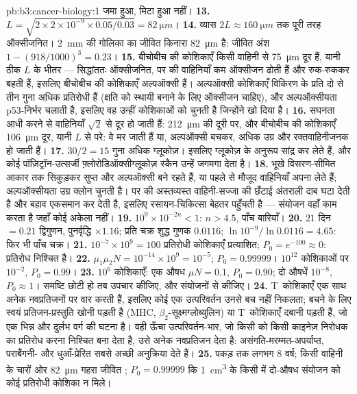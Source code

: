 \begin{solution}{pb:b3:cancer-biology:1}
जमा हुआ, मिटा हुआ नहीं।
\textbf{13.} $L = \sqrt{2\times 2\times 10^{-9}\times 0.05/0.03} =
\qty{82}{\micro m}$।
\textbf{14.} व्यास $2L \approx
\qty{160}{\micro m}$ तक पूरी तरह ऑक्सीजनित। \qty{2}{mm} की गोलिका का
जीवित किनारा \qty{82}{\micro m} है: जीवित अंश $1 - (918/1000)^{3} = 0.23$।
\textbf{15.} बीचोबीच की कोशिकाएँ किसी वाहिनी से \qty{75}{\micro m} दूर
हैं, यानी ठीक $L$ के भीतर --- सिद्धांततः ऑक्सीजनित, पर  की
वाहिनियाँ कम ऑक्सीजन ढोती हैं और रुक-रुककर बहती हैं, इसलिए बीचोबीच की
कोशिकाएँ अल्पऑक्सी हैं। अल्पऑक्सी कोशिकाएँ विकिरण के प्रति दो से तीन
गुना अधिक प्रतिरोधी हैं (क्षति को स्थायी बनाने के लिए ऑक्सीजन चाहिए),
और अल्पऑक्सीयता p53-निर्भर  चलाती है, इसलिए वह उन्हीं
कोशिकाओं को चुनती है जिन्होंने  खो दिया है।
\textbf{16.} सघनता आधी करने से वाहिनियाँ $\sqrt{2}$ से दूर हो जाती हैं:
\qty{212}{\micro m} की दूरी पर, और बीचोबीच की कोशिकाएँ
\qty{106}{\micro m} दूर, यानी $L$ से परे: वे मर जाती हैं या, अल्पऑक्सी
बचकर, अधिक उग्र और रक्तवाहिनीजनक हो जाती हैं।
\textbf{17.} $30/2 = 15$ गुना अधिक ग्लूकोज़। इसलिए  ग्लूकोज़ के
अनुरूप सांद्र कर लेते हैं, और कोई पॉज़िट्रॉन-उत्सर्जी
फ़्लोरोडिऑक्सीग्लूकोज़ स्कैन उन्हें जगमगा देता है।
\textbf{18.} भूखे  विसरण-सीमित आकार तक सिकुड़कर सुप्त और
अल्पऑक्सी बने रहते हैं, या पहले से मौजूद वाहिनियाँ अपना लेते हैं;
अल्पऑक्सीयता उग्र क्लोन चुनती है। पर  की अस्तव्यस्त
वाहिनी-सज्जा की छँटाई अंतराली दाब घटा देती है और बहाव एकसमान कर देती
है, इसलिए रसायन-चिकित्सा बेहतर पहुँचती है --- संयोजन वहाँ काम करता है
जहाँ कोई अकेला नहीं।
\textbf{19.} $10^{9}\times 10^{-2n} < 1$: $n > 4.5$, पाँच बारियाँ।
\textbf{20.} $21$ दिन $= 0.21$ द्विगुणन, पुनर्वृद्धि $\times 1.16$;
प्रति चक्र शुद्ध गुणक $0.0116$; $\ln 10^{-9}/\ln 0.0116 = 4.65$: फिर भी
पाँच चक्र।
\textbf{21.} $10^{-7}\times 10^{9} = 100$ प्रतिरोधी कोशिकाएँ
प्रत्याशित; $P_{0} = e^{-100} \approx 0$: प्रतिरोध निश्चित है।
\textbf{22.} $\mu_{1}\mu_{2}N = 10^{-14}\times 10^{9} = 10^{-5}$;
$P_{0} = 0.99999$। $10^{12}$ कोशिकाओं पर $10^{-2}$, $P_{0} = 0.99$।
\textbf{23.} $10^{6}$ कोशिकाएँ: एक औषध $\mu N = 0.1$, $P_{0} = 0.90$; दो
औषधें $10^{-8}$, $P_{0} \approx 1$। समष्टि छोटी हो तब उपचार कीजिए,
और संयोजनों से कीजिए।
\textbf{24.} T~कोशिकाएँ एक साथ अनेक नवप्रतिजनों पर वार करती हैं, इसलिए
कोई एक उत्परिवर्तन उनसे बच नहीं निकलता; बचने के लिए स्वयं
प्रतिजन-प्रस्तुति खोनी पड़ती है (MHC, $\beta_{2}$-सूक्ष्मग्लोब्युलिन)
या T~कोशिकाएँ दबानी पड़ती हैं, जो एक भिन्न और दुर्लभ वर्ग की घटना है।
वही ऊँचा उत्परिवर्तन-भार, जो किसी  को किसी काइनेज़ निरोधक का
प्रतिरोध करना निश्चित बना देता है, उसे अनेक नवप्रतिजन देता है:
असंगति-मरम्मत-अपर्याप्त, पराबैंगनी- और धुआँ-प्रेरित  सबसे अच्छी
अनुक्रिया देते हैं।
\textbf{25.} पकड़ तक लगभग $8$ वर्ष; किसी वाहिनी के चारों ओर
\qty{82}{\micro m} गहरा जीवित ; $P_{0} = 0.99999$ कि
\qty{1}{cm^3} के किसी  में दो-औषध संयोजन को कोई प्रतिरोधी कोशिका
न मिले।
\end{solution}
